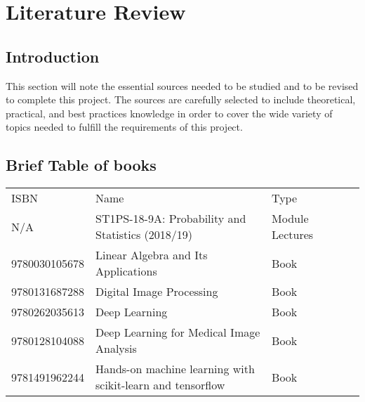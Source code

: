 \chapter{Literature Review}
	\section{Introduction}
		This section will note the essential sources needed to be studied and to be revised to complete this project. The sources are carefully
		selected to include theoretical, practical, and best practices knowledge in order to cover the wide variety of topics needed to fulfill the 
		requirements of this project.
	\section{Brief Table of books}
	\begin{table}[H]
		\begin{tabular}{lllll}
			ISBN 			& Name 	& Type  &  &  \\
			N/A  			&ST1PS-18-9A: Probability and Statistics (2018/19)&Module Lectures&  &  \\
			9780030105678  	&Linear Algebra and Its Applications&Book&  &  \\
			9780131687288  	&Digital Image Processing&Book&  &  \\
			9780262035613  	&Deep Learning &Book&  &  \\
			9780128104088  	&Deep Learning for Medical Image Analysis&Book&  &  \\
			9781491962244  	&Hands-on machine learning with scikit-learn and tensorflow&Book&  &  \\
		\end{tabular}
	\end{table}
